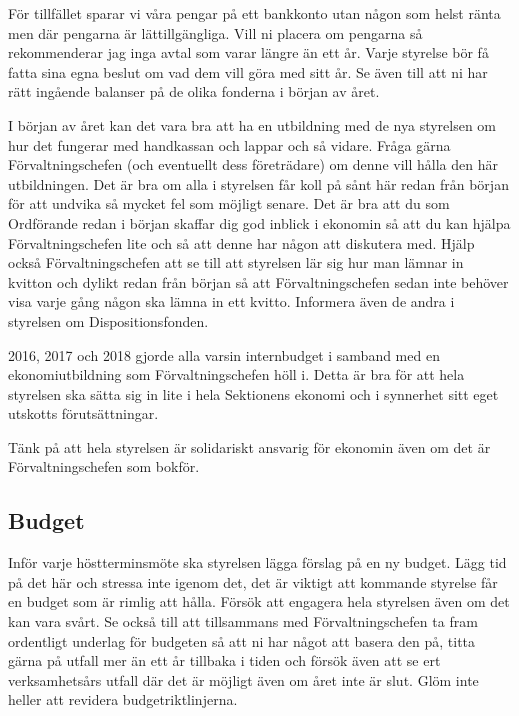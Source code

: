 \documentclass[10pt]{article}
\begin{document}
    För tillfället sparar vi våra pengar på ett bankkonto utan någon som helst ränta men där pengarna är lättillgängliga. Vill ni placera om pengarna så rekommenderar jag inga avtal som varar längre än ett år. Varje styrelse bör få fatta sina egna beslut om vad dem vill göra med sitt år. Se även till att ni har rätt ingående balanser på de olika fonderna i början av året.
    
    I början av året kan det vara bra att ha en utbildning med de nya styrelsen om hur det fungerar med handkassan och lappar och så vidare. Fråga gärna Förvaltningschefen (och eventuellt dess företrädare) om denne vill hålla den här utbildningen. Det är bra om alla i styrelsen får koll på sånt här redan från början för att undvika så mycket fel som möjligt senare. Det är bra att du som Ordförande redan i början skaffar dig god inblick i ekonomin så att du kan hjälpa Förvaltningschefen lite och så att denne har någon att diskutera med. Hjälp också Förvaltningschefen att se till att styrelsen lär sig hur man lämnar in kvitton och dylikt redan från början så att Förvaltningschefen sedan inte behöver visa varje gång någon ska lämna in ett kvitto. Informera även de andra i styrelsen om Dispositionsfonden.
    
    2016, 2017 och 2018 gjorde alla varsin internbudget i samband med en ekonomiutbildning som Förvaltningschefen höll i. Detta är bra för att hela styrelsen ska sätta sig in lite i hela Sektionens ekonomi och i synnerhet sitt eget utskotts förutsättningar.
    
    Tänk på att hela styrelsen är solidariskt ansvarig för ekonomin även om det är Förvaltningschefen som bokför.
    
    \subsection{Budget}
    
    Inför varje höstterminsmöte ska styrelsen lägga förslag på en ny budget. Lägg tid på det här och stressa inte igenom det, det är viktigt att kommande styrelse får en budget som är rimlig att hålla. Försök att engagera hela styrelsen även om det kan vara svårt. Se också till att tillsammans med Förvaltningschefen ta fram ordentligt underlag för budgeten så att ni har något att basera den på, titta gärna på utfall mer än ett år tillbaka i tiden och försök även att se ert verksamhetsårs utfall där det är möjligt även om året inte är slut. Glöm inte heller att revidera budgetriktlinjerna.
    
\end{document}
